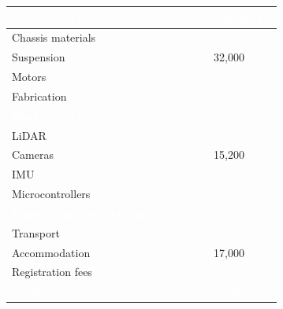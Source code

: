 \documentclass[11pt,a4paper]{article}
\begin{document}
\begin{flushright}
\small
\setlength{\tabcolsep}{4pt}

\begin{tabular}{|l|c|}
    \hline
    \rowcolor{aur_color}
    \textcolor{white}{\textbf{Mechanical System}} & \textcolor{white}{\textbf{Price (in EGP)}}\\
    \hline
    Chassis materials & \\
    Suspension & 32,000 \\
    Motors & \\
    Fabrication & \\
    \hline
    \rowcolor{aur_color}
    \textcolor{white}{\textbf{Electronics \& Sensors}} & \\
    \hline
    LiDAR & \\
    Cameras & 15,200 \\
    IMU & \\
    Microcontrollers & \\
    \hline
    \rowcolor{aur_color}
    \textcolor{white}{\textbf{Logistics \& Competition Fees}} & \\
    \hline
    Transport & \\
    Accommodation & 17,000 \\
    Registration fees & \\
    \hline
    \rowcolor{aur_color}
    \textcolor{white}{\textbf{Total}} & \textcolor{white}{64,200} \\
    \hline
\end{tabular}

\label{tab:budget}

\end{flushright}
\end{document}
